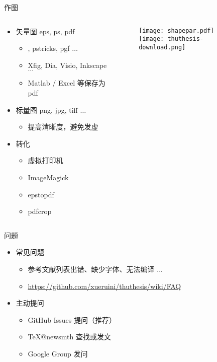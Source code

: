 \begin{frame}{作图}
  \begin{columns}[c]
    \begin{column}{.5\textwidth}
  \begin{itemize}
  \item 矢量图 eps, ps, pdf
    \begin{itemize}
    \item \MP, pstricks, pgf $\ldots$
    \item Xfig, Dia, \alert{Visio}, \alert{Inkscape} $\ldots$
    \item Matlab / Excel 等保存为 pdf
    \end{itemize}
  \item 标量图 png, jpg, tiff $\ldots$
    \begin{itemize}
      \item 提高清晰度，避免发虚
    \end{itemize}
  \item 转化
    \begin{itemize}
    \item 虚拟打印机
    \item ImageMagick
    \item epstopdf
    \item pdfcrop
    \end{itemize}
  \end{itemize}
    \end{column}
    \begin{column}{.4\textwidth}
\begin{figure}[h]
  \centering
\texttt{[image: shapepar.pdf]}\\\vspace{1cm}
\texttt{[image: thuthesis-download.png]}
\end{figure}
    \end{column}
  \end{columns}
\end{frame}

\begin{frame}{\ThuThesis 问题}
    \begin{itemize}
      \item 常见问题
        \begin{itemize}
          \item 参考文献列表出错、缺少字体、无法编译 ...
          \item \url{https://github.com/xueruini/thuthesis/wiki/FAQ}
        \end{itemize}
      \item 主动提问
        \begin{itemize}
          \item GitHub Issues 提问（推荐）
          \item \TeX @newsmth 查找或发文
          \item \href{http://groups.google.com/group/thuthesis}\ThuThesis{} Google Group 发问
        \end{itemize}
    \end{itemize}
\end{frame}



